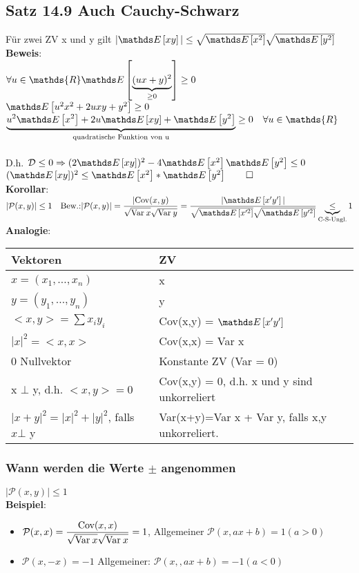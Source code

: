 \subsection{Satz 14.9 Auch Cauchy-Schwarz}
Für zwei ZV x und y gilt $\vert \E\left[xy\right]\vert \leq \sqrt{\E\left[x^2\right]}\sqrt{\E\left[y^2\right]}$\medskip\\
\textbf{Beweis}:\\
$\forall u \in \mathds{R} \E\left[\underbrace{(ux+y)^2}_{\geq 0}\right]\geq 0$\smallskip\\
$\E\left[u^2x^2+2uxy+y^2\right] \geq 0$\smallskip\\
$\underbrace{u^2\E\left[x^2\right]+2u\E\left[xy\right]+\E\left[y^2\right]}_\text{quadratische Funktion von u} \geq 0 \quad \forall u \in \mathds{R}$\smallskip\\
\smallskip\\
D.h. $\mathcal{D} \leq 0 \Rightarrow (2\E\left[xy\right])^2-4\E\left[x^2\right]\E\left[y^2\right] \leq 0$\smallskip\\
$(\E\left[xy\right])^2\leq \E\left[x^2\right]*\E\left[y^2\right]\qed$\medskip\\
\textbf{Korollar}:\\
$\vert \mathcal{P}(x,y) \vert \leq 1 \quad \text{Bew.:} \vert \mathcal{P}(x,y)\vert = \dfrac{\vert \cov(x,y)}{\sqrt{\var\:x}\sqrt{\var\:y}}=\dfrac{\vert \E\left[x'y'\right]\vert}{\sqrt{\E\left[x'^2\right]}\sqrt{\E\left[y'^2\right]}} \underbrace{\leq}_{\text{C-S-Ungl.}} 1$\medskip\\
\textbf{Analogie}:\\
\begin{tabular}{l|l}
	Vektoren & ZV\\\hline
	$x=(x_1,\dots,x_n)$ & x \\
	$y=(y_1,\dots,y_n)$ & y\\
	$<x,y> = \sum x_i y_i$&Cov(x,y) = $\E\left[x'y'\right]$\\
	$|x|^2=<x,x>$&Cov(x,x) = Var x\\
	0 Nullvektor & Konstante ZV (Var = 0)\\
	x $\bot$ y, d.h. $<x,y> = 0$& Cov(x,y) = 0, d.h. x und y sind unkorreliert\\
$|x+y|^2=|x|^2+|y|^2$, falls $x\bot$ y	& Var(x+y)=Var x + Var y, falls x,y unkorreliert.
\end{tabular}
\subsubsection{Wann werden die Werte $ \pm $ angenommen}
$\vert \mathcal{P}(x,y)\vert \leq 1$\smallskip\\
\textbf{Beispiel}: \begin{itemize}
	\item $\mathcal{P}(x,x) =  \dfrac{\text{Cov}(x,x)}{\sqrt{\text{Var} \:x}\sqrt{\text{Var} \:x}}= 1$, Allgemeiner $\mathcal{P}(x,ax+b)=1 (a > 0)$
	\item $\mathcal{P}(x,-x)=-1$ Allgemeiner: $\mathcal{P}(x,,ax+b)=-1 (a<0)$
\end{itemize}

